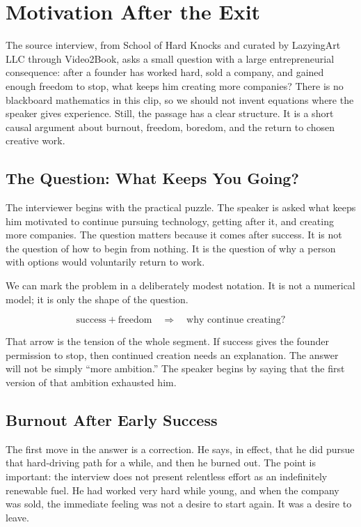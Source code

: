 \chapter{Motivation After the Exit}

The source interview, from School of Hard Knocks and curated by LazyingArt LLC through Video2Book, asks a small question with a large entrepreneurial consequence: after a founder has worked hard, sold a company, and gained enough freedom to stop, what keeps him creating more companies? There is no blackboard mathematics in this clip, so we should not invent equations where the speaker gives experience. Still, the passage has a clear structure. It is a short causal argument about burnout, freedom, boredom, and the return to chosen creative work.

\section{The Question: What Keeps You Going?}

The interviewer begins with the practical puzzle. The speaker is asked what keeps him motivated to continue pursuing technology, getting after it, and creating more companies. The question matters because it comes after success. It is not the question of how to begin from nothing. It is the question of why a person with options would voluntarily return to work.

We can mark the problem in a deliberately modest notation. It is not a numerical model; it is only the shape of the question.

\begin{equation}
\text{success} + \text{freedom} \quad \Longrightarrow \quad \text{why continue creating?}
\end{equation}

That arrow is the tension of the whole segment. If success gives the founder permission to stop, then continued creation needs an explanation. The answer will not be simply ``more ambition.'' The speaker begins by saying that the first version of that ambition exhausted him.

\section{Burnout After Early Success}

The first move in the answer is a correction. He says, in effect, that he did pursue that hard-driving path for a while, and then he burned out. The point is important: the interview does not present relentless effort as an indefinitely renewable fuel. He had worked very hard while young, and when the company was sold, the immediate feeling was not a desire to start again. It was a desire to leave.

